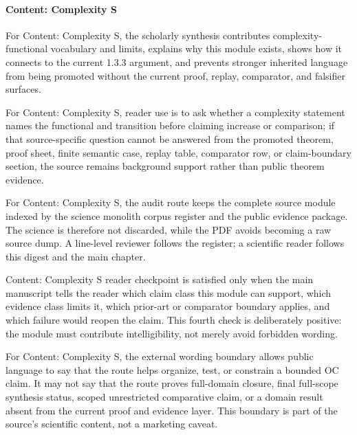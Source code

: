 \paragraph{Content: Complexity S}

For Content: Complexity S, the scholarly synthesis contributes complexity-functional vocabulary and limits, explains why this module exists, shows how it connects to the current 1.3.3 argument, and prevents stronger inherited language from being promoted without the current proof, replay, comparator, and falsifier surfaces.


For Content: Complexity S, reader use is to ask whether a complexity statement names the functional and transition before claiming increase or comparison; if that source-specific question cannot be answered from the promoted theorem, proof sheet, finite semantic case, replay table, comparator row, or claim-boundary section, the source remains background support rather than public theorem evidence.


For Content: Complexity S, the audit route keeps the complete source module indexed by the science monolith corpus register and the public evidence package. The science is therefore not discarded, while the PDF avoids becoming a raw source dump. A line-level reviewer follows the register; a scientific reader follows this digest and the main chapter.


Content: Complexity S reader checkpoint is satisfied only when the main manuscript tells the reader which claim class this module can support, which evidence class limits it, which prior-art or comparator boundary applies, and which failure would reopen the claim. This fourth check is deliberately positive: the module must contribute intelligibility, not merely avoid forbidden wording.


For Content: Complexity S, the external wording boundary allows public language to say that the route helps organize, test, or constrain a bounded OC claim. It may not say that the route proves full-domain closure, final full-scope synthesis status, scoped unrestricted comparative claim, or a domain result absent from the current proof and evidence layer. This boundary is part of the source's scientific content, not a marketing caveat.
